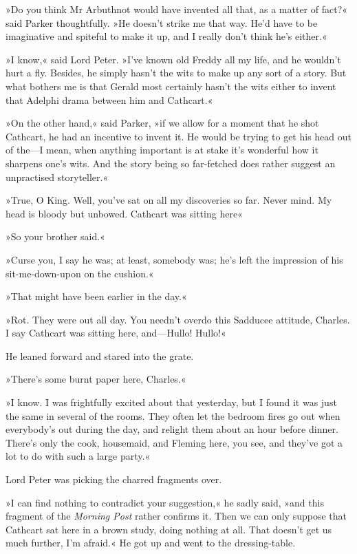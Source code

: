 »Do you think Mr Arbuthnot would have invented all that, as a matter of fact?« said Parker thoughtfully. »He doesn't strike me that way. He'd have to be imaginative and spiteful to make it up, and I really don't think he's either.«

»I know,« said Lord Peter. »I've known old Freddy all my life, and he wouldn't hurt a fly. Besides, he simply hasn't the wits to make up any sort of a story. But what bothers me is that Gerald most certainly hasn't the wits either to invent that Adelphi drama between him and Cathcart.«

»On the other hand,« said Parker, »if we allow for a moment that he shot Cathcart, he had an incentive to invent it. He would be trying to get his head out of the\allowbreak---\allowbreak I mean, when anything important is at stake it's wonderful how it sharpens one's wits. And the story being so far-fetched does rather suggest an unpractised storyteller.«

»True, O King. Well, you've sat on all my discoveries so far. Never mind. My head is bloody but unbowed. Cathcart was sitting here\longdash«

»So your brother said.«

»Curse you, I say he was; at least, somebody was; he's left the impression of his sit-me-down-upon on the cushion.«

»That might have been earlier in the day.«

»Rot. They were out all day. You needn't overdo this Sadducee attitude, Charles. I say Cathcart was sitting here, and\allowbreak---\allowbreak Hullo! Hullo!«

He leaned forward and stared into the grate.

»There's some burnt paper here, Charles.«

»I know. I was frightfully excited about that yesterday, but I found it was just the same in several of the rooms. They often let the bedroom fires go out when everybody's out during the day, and relight them about an hour before dinner. There's only the cook, housemaid, and Fleming here, you see, and they've got a lot to do with such a large party.«

Lord Peter was picking the charred fragments over.

»I can find nothing to contradict your suggestion,« he sadly said, »and this fragment of the \textit{Morning Post} rather confirms it. Then we can only suppose that Cathcart sat here in a brown study, doing nothing at all. That doesn't get us much further, I'm afraid.« He got up and went to the dressing-table.


